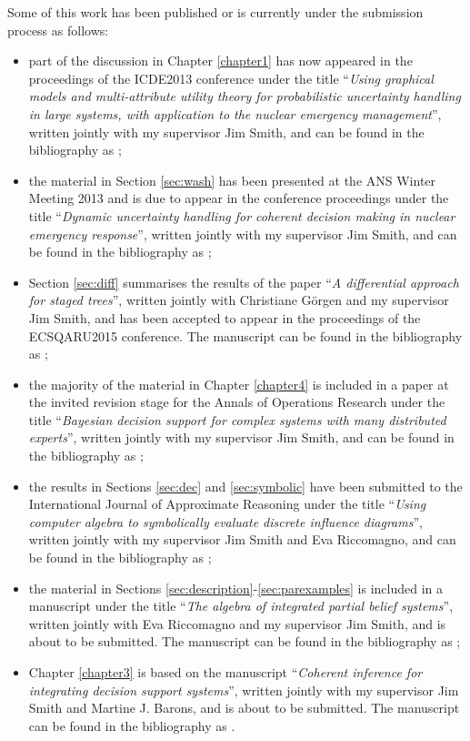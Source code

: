 \documentclass[11pt, oneside]{Thesis} %
\begin{document}
Some of this work has been published or is currently under the submission process as follows:
\begin{itemize}
\item part of the discussion in Chapter \ref{chapter1} has now appeared in the  proceedings of the ICDE2013 conference under the title ``\textit{Using graphical models and multi-attribute utility theory for probabilistic uncertainty handling in large systems, with application to the nuclear emergency management}'', written jointly with my supervisor Jim Smith, and can be found in the bibliography as \citet{Leonelli2013};
\item the material in Section \ref{sec:wash} has been presented at the ANS Winter Meeting 2013 and is due to appear in the conference proceedings under the title ``\textit{Dynamic uncertainty handling for coherent decision making in nuclear emergency response}'', written jointly with my supervisor Jim Smith, and can be found in the bibliography as \citet{Leonelli2013a};
\item Section \ref{sec:diff} summarises the results of the paper ``\textit{A differential approach for staged trees}'', written jointly with Christiane G\"{o}rgen and my supervisor Jim Smith, and has been accepted to appear in the proceedings of the ECSQARU2015 conference. The manuscript can be found in the bibliography as \citet{Gorgen2015};
\item the majority of the material in Chapter \ref{chapter4} is included in a paper at the invited revision stage for the Annals of Operations Research under the title ``\textit{Bayesian decision support for complex systems with many distributed experts}'', written jointly with my supervisor Jim Smith, and can be found in the bibliography as \citet{Leonelli2015};
\item the results in Sections \ref{sec:dec} and \ref{sec:symbolic} have been submitted to the International Journal of Approximate Reasoning under the title ``\textit{Using computer algebra to symbolically evaluate discrete influence diagrams}'', written jointly with my supervisor Jim Smith and Eva Riccomagno, and can be found in the bibliography as \citet{Leonelli2015a};
\item the material in Sections \ref{sec:description}-\ref{sec:parexamples} is included in a manuscript under the title ``\textit{The algebra of integrated partial belief systems}'', written jointly with Eva Riccomagno and my supervisor Jim Smith, and is about to be submitted. The manuscript can be found in the bibliography as \citet{Leonelli2015b};
\item Chapter \ref{chapter3} is based on the manuscript ``\textit{Coherent inference for integrating decision support systems}'', written jointly with my supervisor Jim Smith and Martine J. Barons, and is about to be submitted. The manuscript can be found in the bibliography as \citet{Smith2015}.     
\end{itemize} 
\end{document}
